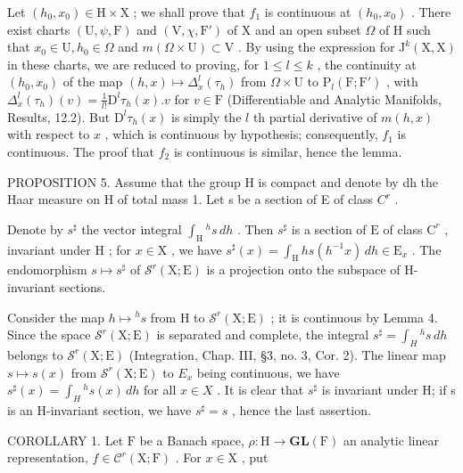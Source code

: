 Let \((h_{0}, x_{0}) \in \mathrm{H} \times \mathrm{X}\) ; we shall prove that \(f_{1}\) is continuous at \((h_{0}, x_{0})\) . There exist charts \((\mathrm{U}, \psi, \mathrm{F})\) and \((\mathrm{V}, \chi, \mathrm{F}')\) of \(\mathrm{X}\) and an open subset \(\Omega\) of \(\mathrm{H}\) such that \(x_{0} \in \mathrm{U}, h_{0} \in \Omega\) and \(m(\Omega \times \mathrm{U}) \subset \mathrm{V}\) . By using the expression for \(\mathrm{J}^{k}(\mathrm{X}, \mathrm{X})\) in these charts, we are reduced to proving, for \(1 \leq l \leq k\) , the continuity at \((h_{0}, x_{0})\) of the map \((h, x) \mapsto \Delta_{x}^{l}(\tau_{h})\) from \(\Omega \times \mathrm{U}\) to \(\mathrm{P}_{l}(\mathrm{F}; \mathrm{F}')\) , with \(\Delta_{x}^{l}(\tau_{h})(v) = \frac{1}{l!}\mathrm{D}^{l}\tau_{h}(x).v\) for \(v \in \mathrm{F}\) (Differentiable and Analytic Manifolds, Results, 12.2). But \(\mathrm{D}^{l}\tau_{h}(x)\) is simply the \(l\) th partial derivative of \(m(h, x)\) with respect to \(x\) , which is continuous by hypothesis; consequently, \(f_{1}\) is continuous. The proof that \(f_{2}\) is continuous is similar, hence the lemma.

PROPOSITION 5. Assume that the group H is compact and denote by dh the Haar measure on H of total mass 1. Let s be a section of E of class \(C^{r}\) .

Denote by \(s^{\sharp}\) the vector integral \(\int_{\mathrm{H}}{}^{h}s\,dh\) . Then \(s^{\sharp}\) is a section of \(\mathrm{E}\) of class \(\mathrm{C}^r\) , invariant under \(\mathrm{H}\) ; for \(x \in \mathrm{X}\) , we have \(s^{\sharp}(x) = \int_{\mathrm{H}}hs(h^{-1}x)\,dh \in \mathrm{E}_x\) . The endomorphism \(s \mapsto s^{\sharp}\) of \(\mathcal{S}^r(\mathrm{X};\mathrm{E})\) is a projection onto the subspace of H-invariant sections.

Consider the map \(h \mapsto {}^{h}s\) from H to \(\mathcal{S}^{r}(\mathrm{X};\mathrm{E})\) ; it is continuous by Lemma 4. Since the space \(\mathcal{S}^{r}(\mathrm{X};\mathrm{E})\) is separated and complete, the integral \(s^{\sharp} = \int_{H}{}^{h}s\,dh\) belongs to \(\mathcal{S}^{r}(\mathrm{X};\mathrm{E})\) (Integration, Chap. III, §3, no. 3, Cor. 2). The linear map \(s \mapsto s(x)\) from \(\mathcal{S}^{r}(\mathrm{X};\mathrm{E})\) to \(E_{x}\) being continuous, we have \(s^{\sharp}(x) = \int_{H}{}^{h}s(x)\,dh\) for all \(x \in X\) . It is clear that \(s^{\sharp}\) is invariant under H; if s is an H-invariant section, we have \(s^{\sharp} = s\) , hence the last assertion.

COROLLARY 1. Let \(\mathrm{F}\) be a Banach space, \(\rho : \mathrm{H} \to \mathbf{GL}(\mathrm{F})\) an analytic linear representation, \(f \in \mathcal{C}^r(\mathrm{X};\mathrm{F})\) . For \(x \in \mathrm{X}\) , put


